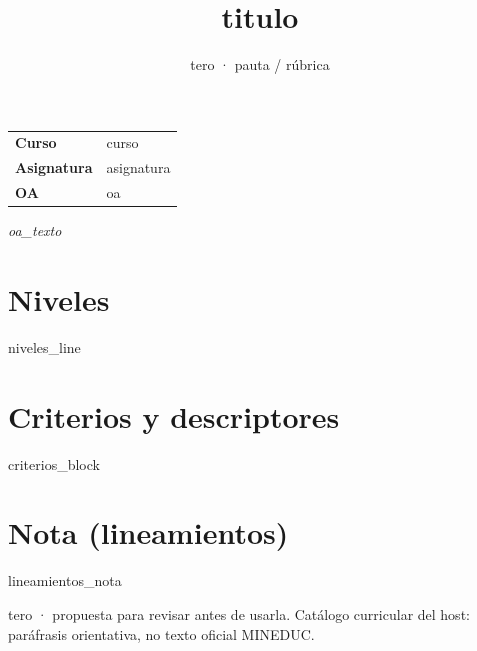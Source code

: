 \documentclass[11pt,a4paper]{article}
\title{{{titulo}}}
\author{tero · pauta / rúbrica}
\date{}
\begin{document}
\maketitle

\begin{center}
\begin{tabular}{@{}ll@{}}
\toprule
\textbf{Curso} & {{curso}} \\
\textbf{Asignatura} & {{asignatura}} \\
\textbf{OA} & {{oa}} \\
\bottomrule
\end{tabular}
\end{center}

\vspace{0.5em}
\noindent\textit{{{oa_texto}}}

\section*{Niveles}
{{niveles_line}}

\section*{Criterios y descriptores}
{{criterios_block}}

\section*{Nota (lineamientos)}
{{lineamientos_nota}}

\vfill
{\footnotesize tero · propuesta para revisar antes de usarla. Catálogo curricular del host: paráfrasis orientativa, no texto oficial MINEDUC.}
\end{document}
